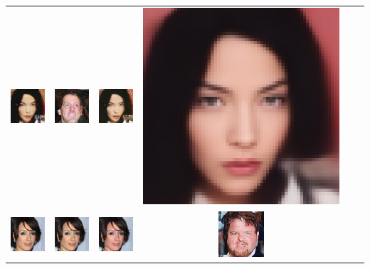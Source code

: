 \begin{table}[h!]
{\begin{tabular}{cccccc}
        \includegraphics[width=.145\textwidth]{chapter4/figures/images/celebA/corrected_reconstruction/5.png} &
        \includegraphics[width=.145\textwidth]{chapter4/figures/images/celebA/diffusion_decoder_beta_0.01/5.png} &
        \includegraphics[width=.145\textwidth]{chapter4/figures/images/celebA/diffusion_decoder_beta_0/5.png} &
        \includegraphics[width=.145\textwidth]{chapter4/figures/images/celebA/VAE_reconstruction/5.png} \\
        \includegraphics[width=.145\textwidth]{chapter4/figures/images/celebA/original/6.png} &   
        \includegraphics[width=.145\textwidth]{chapter4/figures/images/celebA/reconstruction/6.png} &
        \includegraphics[width=.145\textwidth]{chapter4/figures/images/celebA/corrected_reconstruction/6.png} &
        \includegraphics[width=.145\textwidth]{chapter4/figures/images/celebA/diffusion_decoder_beta_0.01/6.png} &

\end{tabular}}
\end{table}

